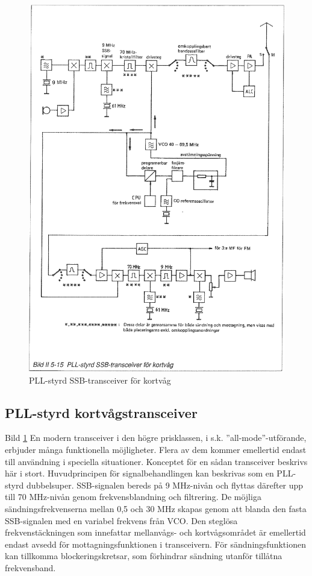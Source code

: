 \begin{figure}
  \includegraphics[width=\textwidth]{images/bild_2_5-15}
  \caption{PLL-styrd SSB-transceiver för kortvåg}
  \label{fig:bildII5-15}
\end{figure}

\subsection{PLL-styrd kortvågstransceiver}

Bild \ref{fig:bildII5-15} En modern transceiver i den högre prisklassen, i
s.k. ''all-mode''-utförande, erbjuder många funktionella
möjligheter. Flera av dem kommer emellertid endast till användning i
speciella situationer. Konceptet för en sådan transceiver beskrivs här
i stort.  Huvudprincipen för signalbehandlingen kan beskrivas som en
PLL-styrd dubbelsuper.  SSB-signalen bereds på 9 MHz-nivån och flyttas
därefter upp till 70 MHz-nivån genom frekvensblandning och
filtrering. De möjliga sändningsfrekvenserna mellan 0,5 och 30 MHz
skapas genom att blanda den fasta SSB-signalen med en variabel
frekvens från VCO. Den steglösa frekvenstäckningen som innefattar
mellanvågs- och kortvågsområdet är emellertid endast avsedd för
mottagningsfunktionen i transceivern. För sändningsfunktionen kan
tillkomma blockeringskretsar, som förhindrar sändning utanför tillåtna
frekvensband.

